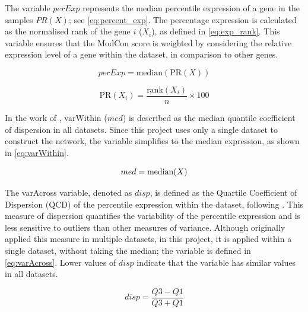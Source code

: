 The variable $perExp$ represents the median percentile expression of a gene in the samples $PR(X)$; see \cref{eq:percent_exp}. The percentage expression is calculated as the normalised rank of the gene $i$ (\(X_i\)), as defined in \cref{eq:exp_rank}. This variable ensures that the ModCon score is weighted by considering the relative expression level of a gene within the dataset, in comparison to other genes.

\begin{equation} \label{eq:percent_exp}
    perExp = \text{median}\left(\text{PR}(X)\right)
\end{equation}

\begin{equation} \label{eq:exp_rank}
    \text{PR}(X_i) = \frac{\text{rank}(X_i)}{n} \times 100
\end{equation}

In the work of \citet{Care2019-ij}, varWithin ($med$) is described as the median quantile coefficient of dispersion in all datasets. Since this project uses only a single dataset to construct the network, the variable simplifies to the median expression, as shown in \cref{eq:varWithin}.


\begin{equation} \label{eq:varWithin}
    med = \text{median}(X) \\
\end{equation}

The varAcross variable, denoted as $disp$, is defined as the Quartile Coefficient of Dispersion (QCD) of the percentile expression within the dataset, following \citet{Care2019-ij}. This measure of dispersion quantifies the variability of the percentile expression and is less sensitive to outliers than other measures of variance. Although \citet{Care2019-ij} originally applied this measure in multiple datasets, in this project, it is applied within a single dataset, without taking the median; the variable is defined in \cref{eq:varAcross}. Lower values of $disp$ indicate that the variable has similar values in all datasets.


\begin{equation} \label{eq:varAcross}
    disp = \frac{Q3 - Q1}{Q3 + Q1}
\end{equation}

